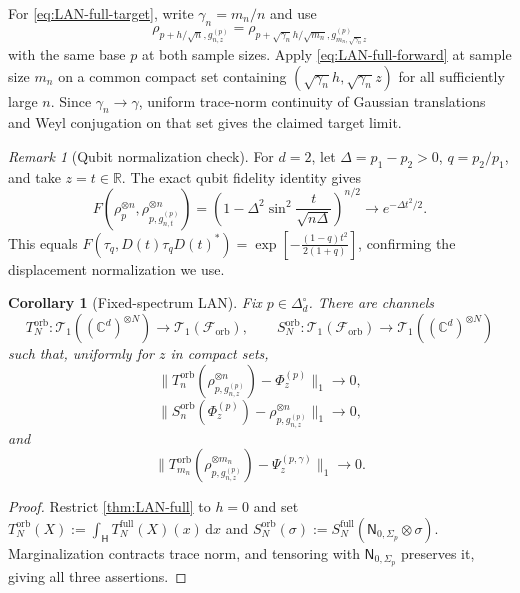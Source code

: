 \documentclass[11pt]{article}
\newtheorem{corollary}[corollary]{Corollary}
\theoremstyle{remark}
\newtheorem{remark}[remark]{Remark}
\theoremstyle{plain}
\newcommand{\C}{\mathbb C}
\newcommand{\R}{\mathbb R}
\newcommand{\cF}{\mathcal F}
\newcommand{\cT}{\mathcal T}
\newcommand{\dd}{\mathrm d}
\newcommand{\ot}{\otimes}
\begin{document}
For \eqref{eq:LAN-full-target}, write \(\gamma_n=m_n/n\) and use
\[
  \rho_{p+h/\sqrt n,g_{n,z}^{(p)}}
  =\rho_{p+\sqrt{\gamma_n}h/\sqrt{m_n},
          g_{m_n,\sqrt{\gamma_n}z}^{(p)}}
\]
with the same base \(p\) at both sample sizes.  Apply
\eqref{eq:LAN-full-forward} at sample size \(m_n\) on a common compact
set containing \((\sqrt{\gamma_n}h,\sqrt{\gamma_n}z)\) for all sufficiently
large \(n\).  Since \(\gamma_n\to\gamma\), uniform trace-norm continuity
of Gaussian translations and Weyl conjugation on that set gives the
claimed target limit.

\begin{remark}[Qubit normalization check]
For \(d=2\), let \(\Delta=p_1-p_2>0\), \(q=p_2/p_1\), and take
\(z=t\in\R\).  The exact qubit fidelity identity gives
\[
  F\!\left(\rho_p^{\ot n},
    \rho_{p,g_{n,t}^{(p)}}^{\ot n}\right)
  =\left(1-\Delta^2\sin^2\frac{t}{\sqrt{n\Delta}}\right)^{n/2}
  \longrightarrow e^{-\Delta t^2/2}.
\]
This equals
\(F(\tau_q,D(t)\tau_qD(t)^*)
=\exp\left[-\frac{(1-q)t^2}{2(1+q)}\right]\), confirming the displacement normalization we use.
\end{remark}

\begin{corollary}[Fixed-spectrum LAN]\label{cor:LAN-orb}
Fix \(p\in\Delta_d^\circ\).  There are channels
\[
  T_N^{\mathrm{orb}}:\cT_1((\C^d)^{\ot N})\to\cT_1(\cF_{\mathrm{orb}}),
  \qquad
  S_N^{\mathrm{orb}}:\cT_1(\cF_{\mathrm{orb}})\to\cT_1((\C^d)^{\ot N})
\]
such that, uniformly for \(z\) in compact sets,
\begin{equation}\label{eq:LAN-known-forward}
  \|T_n^{\mathrm{orb}}(\rho_{p,g_{n,z}^{(p)}}^{\ot n})-\Phi_z^{(p)}\|_1
  \longrightarrow0,
\end{equation}
\begin{equation}\label{eq:LAN-known-reverse}
  \|S_n^{\mathrm{orb}}(\Phi_z^{(p)})-\rho_{p,g_{n,z}^{(p)}}^{\ot n}\|_1
  \longrightarrow0,
\end{equation}
and
\begin{equation}\label{eq:LAN-known-target}
  \|T_{m_n}^{\mathrm{orb}}(\rho_{p,g_{n,z}^{(p)}}^{\ot m_n})
       -\Psi_z^{(p,\gamma)}\|_1
  \longrightarrow0.
\end{equation}
\end{corollary}

\begin{proof}
Restrict \cref{thm:LAN-full} to \(h=0\) and set
\(T_N^{\mathrm{orb}}(X):=\int_{\mathsf H}
T_N^{\mathrm{full}}(X)(x)\,\dd x\) and
\(S_N^{\mathrm{orb}}(\sigma):=S_N^{\mathrm{full}}
(\mathsf N_{0,\Sigma_p}\ot\sigma)\).
Marginalization contracts trace norm, and tensoring with
\(\mathsf N_{0,\Sigma_p}\) preserves it, giving all three assertions.
\end{proof}
\end{document}
